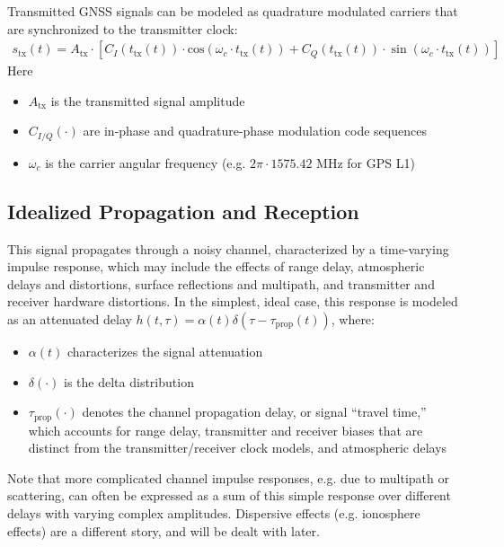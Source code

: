 \documentclass{article}
\begin{document}
Transmitted GNSS signals can be modeled as quadrature modulated carriers that are synchronized to the transmitter clock:
%
\begin{align}
s_\text{tx}(t) = A_\text{tx} \cdot \left[ C_I(t_\text{tx}(t)) \cdot \text{cos}\left( \omega_c \cdot t_\text{tx}(t) \right) +C_Q(t_\text{tx}(t))\cdot\sin(\omega_c \cdot t_\text{tx}(t)) \right]
\end{align}
%
Here
%
\begin{itemize}
    \item $A_\text{tx}$ is the transmitted signal amplitude
    \item $C_{I/Q}(\cdot)$ are in-phase and quadrature-phase modulation code sequences
    \item $\omega_c$ is the carrier angular frequency (e.g. $2\pi \cdot 1575.42$ MHz for GPS L1)
\end{itemize}




\subsection{Idealized Propagation and Reception}

This signal propagates through a noisy channel, characterized by a time-varying impulse response, which may include the effects of range delay, atmospheric delays and distortions, surface reflections and multipath, and transmitter and receiver hardware distortions.  In the simplest, ideal case, this response is modeled as an attenuated delay $h(t,\tau) = \alpha(t) \delta(\tau - \tau_\text{prop}(t))$, where:
\begin{itemize}
    \item $\alpha(t)$ characterizes the signal attenuation
    \item $\delta(\cdot)$ is the delta distribution
    \item $\tau_\text{prop}(\cdot)$ denotes the channel propagation delay, or signal ``travel time,'' which accounts for range delay, transmitter and receiver biases that are distinct from the transmitter/receiver clock models, and atmospheric delays
\end{itemize}
%
Note that more complicated channel impulse responses, e.g. due to multipath or scattering, can often be expressed as a sum of this simple response over different delays with varying complex amplitudes.  Dispersive effects (e.g. ionosphere effects) are a different story, and will be dealt with later.
\end{document}
